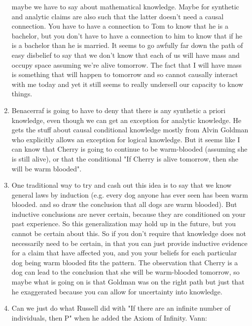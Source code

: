 \documentclass[12pt]{article}
\theoremstyle{definition}
\begin{document}
\begin{enumerate}
        maybe we have to say about mathematical knowledge. Maybe for synthetic
        and analytic claims are also such that the latter doesn't need a causal
        connection. You have to have a connection to Tom to know that he is a
        bachelor, but you don't have to have a connection to him to know that
        if he is a bachelor than he is married. It seems to go awfully far down
        the path of easy disbelief to say that we don't know that each of us
        will have mass and occupy space assuming we're alive tomorrow. The fact
        that I will have mass is something that will happen to tomorrow and so
        cannot causally interact with me today and yet it still seems to really
        undersell our capacity to know things. 
    \item
        Benacerraf is going to have to deny that there is any synthetic a
        priori knowledge, even though we can get an exception for analytic
        knowledge. He gets the stuff about causal conditional knowledge mostly
        from Alvin Goldman who explicitly allows an exception for logical
        knowledge. But it seems like I can know that Cherry is going to
        continue to be warm-blooded (assuming she is still alive), or that the
        conditional "If Cherry is alive tomorrow, then she will be warm
        blooded".
    \item
        One traditional way to try and cash out this idea is to say that
        we know general laws by induction (e.g. every dog anyone has ever seen
        has been warm blooded. and so draw the conclusion that all dogs are
        warm blooded). But inductive conclusions are never certain, because
        they are conditioned on your past experience. So this generalization
        may hold up in the future, but you cannot be certain about this. So if
        you don't require that knowledge does not necessarily need to be
        certain, in that you can just provide inductive evidence for a claim
        that have affected you, and you your beliefs for each particular dog
        being warm blooded fits the pattern. The observation that Cherry is a
        dog can lead to the conclusion that she will be warm-blooded tomorrow,
        so maybe what is going on is that Goldman was on the right path but
        just that he exaggerated because you can allow for uncertainty into
        knowledge.
    \item
        Can we just do what Russell did with "If there are an infinite number
        of individuals, then P" when he added the Axiom of Infinity. Vann:

\end{enumerate}
\end{document}

